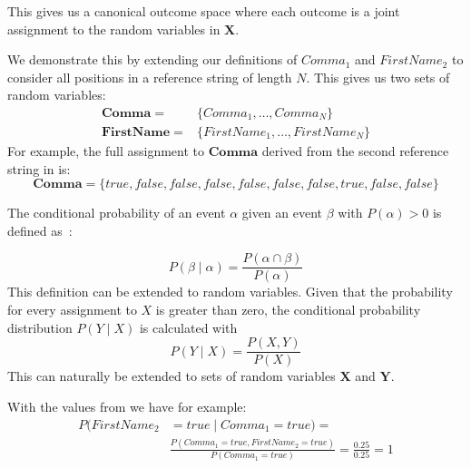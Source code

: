 This gives us a \gls{canonical outcome space} where each outcome is a joint assignment to the \glspl{random variable} in $\mathbf{X}$.

We demonstrate this by extending our definitions of $Comma_1$ and $FirstName_2$ to consider all positions in a reference string of length $N$.
This gives us two sets of \glspl{random variable}:
\begin{equation*}
  \begin{split}
    \mathbf{Comma}=& \{Comma_1, \dots, Comma_N\}\\
    \mathbf{FirstName}=& \{FirstName_1, \dots, FirstName_N\}
  \end{split}
\end{equation*}
For example, the full assignment to $\mathbf{Comma}$ derived from the second reference string in  is:
\begin{equation*}
  \mathbf{Comma}=\{true, false, false, false, false, false, false, true, false, false\}
\end{equation*}

\bigskip

The \gls{conditional probability} of an \gls{event} $\alpha$ given an \gls{event} $\beta$ with $P(\alpha)>0$ is defined as~\cite{koller2009probabilistic}:

\begin{equation}
\label{equ:conditional-probability-event}
P(\beta\mid\alpha) = \frac{P(\alpha\cap\beta)}{P(\alpha)}
\end{equation}
This definition can be extended to \glspl{random variable}.
Given that the probability for every assignment to $X$ is greater than zero, the \gls{conditional probability distribution} $P(Y\mid X)$ is calculated with
\begin{equation}
\label{equ:conditional-probability-random-variable}
P(Y\mid X) = \frac{P(X,Y)}{P(X)}
\end{equation}
This can naturally be extended to sets of \glspl{random variable} $\mathbf{X}$ and $\mathbf{Y}$.

With the values from  we have for example:
\begin{equation*}
  \begin{split}
    P(FirstName_2&{=}true\mid Comma_1{=}true) = \\
    &\frac{P(Comma_1{=}true, FirstName_2{=}true)}{P(Comma_1{=}true)}=\frac{0.25}{0.25}=1
  \end{split}
\end{equation*}

